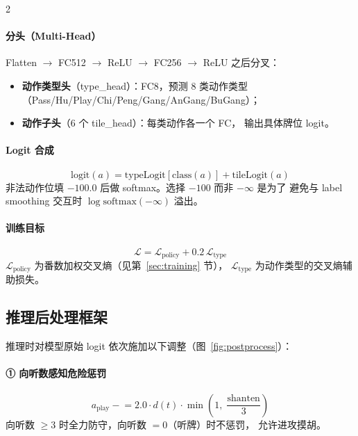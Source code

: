 \documentclass{article}
\newcommand{\calL}{\mathcal{L}}
\begin{document}
\begin{multicols}{2}
\paragraph{分头（Multi-Head）}
Flatten $\to$ FC512 $\to$ ReLU $\to$ FC256 $\to$ ReLU 之后分叉：
\begin{itemize}[leftmargin=*,topsep=2pt,itemsep=1pt,parsep=0pt]
  \item \textbf{动作类型头}（type\_head）：FC8，预测 8 类动作类型
    （Pass/Hu/Play/Chi/Peng/Gang/AnGang/BuGang）；
  \item \textbf{动作子头}（6 个 tile\_head）：每类动作各一个 FC，
    输出具体牌位 logit。
\end{itemize}

\paragraph{Logit 合成}
\begin{equation}
\text{logit}(a) = \text{typeLogit}[\text{class}(a)] + \text{tileLogit}(a)
\end{equation}
非法动作位填 $-100.0$ 后做 softmax。选择 $-100$ 而非 $-\infty$ 是为了
避免与 label smoothing 交互时 $\log\text{softmax}(-\infty)$ 溢出。

\paragraph{训练目标}
\begin{equation}
\calL = \calL_{\text{policy}} + 0.2\,\calL_{\text{type}}
\end{equation}
$\calL_{\text{policy}}$ 为番数加权交叉熵（见第~\ref{sec:training} 节），
$\calL_{\text{type}}$ 为动作类型的交叉熵辅助损失。

\subsection{推理后处理框架}

推理时对模型原始 logit 依次施加以下调整（图~\ref{fig:postprocess}）：

\paragraph{① 向听数感知危险惩罚}
\begin{equation}
a_{\text{play}} \mathrel{-}= 2.0 \cdot d(t) \cdot
\min\!\left(1,\; \frac{\text{shanten}}{3}\right)
\label{eq:danger_pen}
\end{equation}
向听数 $\geq 3$ 时全力防守，向听数 $=0$（听牌）时不惩罚，
允许进攻摸胡。


\end{multicols}
\end{document}
